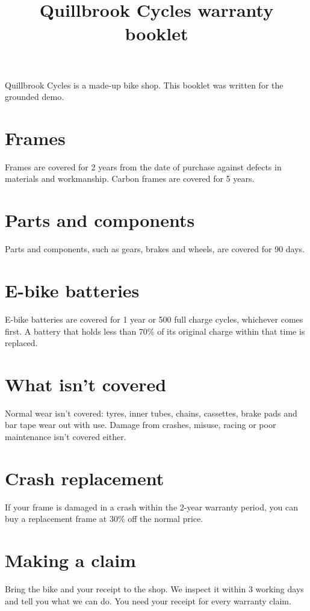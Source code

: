 \documentclass[11pt]{article}
\title{Quillbrook Cycles warranty booklet}
\date{}
\begin{document}
\maketitle
Quillbrook Cycles is a made-up bike shop. This booklet was written for the grounded demo.

\section*{Frames}
Frames are covered for 2 years from the date of purchase against defects in materials and
workmanship. Carbon frames are covered for 5 years.

\section*{Parts and components}
Parts and components, such as gears, brakes and wheels, are covered for 90 days.

\section*{E-bike batteries}
E-bike batteries are covered for 1 year or 500 full charge cycles, whichever comes first. A
battery that holds less than 70\% of its original charge within that time is replaced.

\newpage
\section*{What isn't covered}
Normal wear isn't covered: tyres, inner tubes, chains, cassettes, brake pads and bar tape wear out
with use. Damage from crashes, misuse, racing or poor maintenance isn't covered either.

\section*{Crash replacement}
If your frame is damaged in a crash within the 2-year warranty period, you can buy a replacement
frame at 30\% off the normal price.

\section*{Making a claim}
Bring the bike and your receipt to the shop. We inspect it within 3 working days and tell you what
we can do. You need your receipt for every warranty claim.
\end{document}
